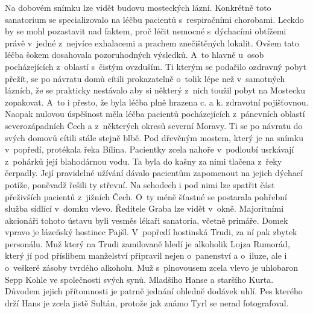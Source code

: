 
Na dobovém snímku lze vidět budovu mosteckých lázní. Konkrétně toto
sanatorium se specializovalo na léčbu pacientů s~respiračními
chorobami. Leckdo by se mohl pozastavit nad faktem, proč léčit nemocné
s~dýchacími obtížemi právě v~jedné z~nejvíce exhalacemi a prachem
znečištěných lokalit. Ovšem tato léčba šokem dosahovala pozoruhodných
výsledků. A~to hlavně u~osob pocházejících z~oblastí s~čistým
ovzduším. Ti kterým se podařilo ozdravný pobyt přežít, se po návratu
domů cítili prokazatelně o~tolik lépe než v~samotných lázních, že se
prakticky nestávalo aby si některý z~nich toužil pobyt na Mostecku
zopakovat. A~to i přesto, že byla léčba plně hrazena c. a k. zdravotní
pojišťovnou. Naopak nulovou úspěšnost měla léčba pacientů
pocházejících z~pánevních oblastí severozápadních Čech a z~některých
okresů severní Moravy. Ti se po návratu do svých domovů cítili stále
stejně blbě. Pod dřevěným mostem, který je na snímku v~popředí,
protékala řeka Bílina. Pacientky zcela nahoře v~podloubí usrkávají
z~pohárků její blahodárnou vodu. Ta byla do kašny za nimi tlačena z~řeky
čerpadly. Její pravidelné užívání dávalo pacientům zapomenout na
jejich dýchací potíže, poněvadž řešili ty střevní. Na schodech i pod
nimi lze spatřit část přeživších pacientů z~jižních Čech. O~ty méně
šťastné se postarala pohřební služba sídlící v~domku vlevo. Ředitele
Graba lze vidět v~okně. Majoritními akcionáři tohoto ústavu byli
vesměs lékaři sanatoria, včetně primáře. Domek vpravo je lázeňský
hostinec Pajšl. V~popředí hostinská Trudi, za ní pak zbytek personálu.
Muž který na Trudi zamilovaně hledí je alkoholik Lojza Rumorád, který
jí pod příslibem manželství připravil nejen o~panenství a o~iluze, ale
i o~veškeré zásoby tvrdého alkoholu. Muž s~plnovousem zcela vlevo je
uhlobaron Sepp Kohle ve společnosti svých synů. Mladšího Hanse a
staršího Kurta. Důvodem jejich přítomnosti je patrně jednání ohledně
dodávek uhlí. Pes kterého drží Hans je zcela jistě Sultán, protože jak
známo Tyrl se nerad fotografoval.

